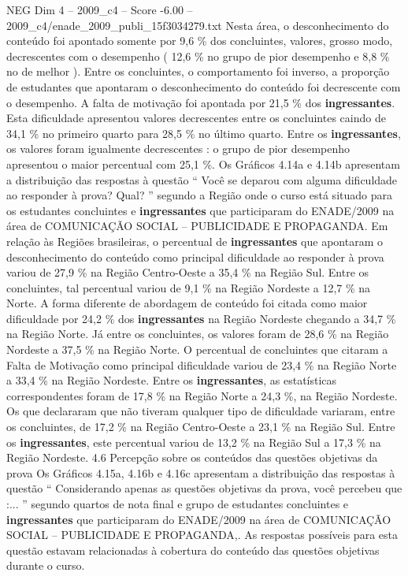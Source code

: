 \begin{textsample}{NEG Dim 4 – 2009\_c4 – Score -6.00 – 2009\_c4/enade\_2009\_publi\_15f3034279.txt}
Nesta área, o desconhecimento do conteúdo foi apontado somente por 9,6 \% dos concluintes, valores, grosso modo, decrescentes com o desempenho ( 12,6 \% no grupo de pior desempenho e 8,8 \% no de melhor ).
Entre os concluintes, o comportamento foi inverso, a proporção de estudantes que apontaram o desconhecimento do conteúdo foi decrescente com o desempenho.
A falta de motivação foi apontada por 21,5 \% dos \textbf{ingressantes}.
Esta dificuldade apresentou valores decrescentes entre os concluintes caindo de 34,1 \% no primeiro quarto para 28,5 \% no último quarto.
Entre os \textbf{ingressantes}, os valores foram igualmente decrescentes : o grupo de pior desempenho apresentou o maior percentual com 25,1 \%.
Os Gráficos 4.14a e 4.14b apresentam a distribuição das respostas à questão “ Você se deparou com alguma dificuldade ao responder à prova?
Qual? ” segundo a Região onde o curso está situado para os estudantes concluintes e \textbf{ingressantes} que participaram do ENADE/2009 na área de COMUNICAÇÃO SOCIAL – PUBLICIDADE E PROPAGANDA.
Em relação às Regiões brasileiras, o percentual de \textbf{ingressantes} que apontaram o desconhecimento do conteúdo como principal dificuldade ao responder à prova variou de 27,9 \% na Região Centro-Oeste a 35,4 \% na Região Sul.
Entre os concluintes, tal percentual variou de 9,1 \% na Região Nordeste a 12,7 \% na Norte.
A forma diferente de abordagem de conteúdo foi citada como maior dificuldade por 24,2 \% dos \textbf{ingressantes} na Região Nordeste chegando a 34,7 \% na Região Norte.
Já entre os concluintes, os valores foram de 28,6 \% na Região Nordeste a 37,5 \% na Região Norte.
O percentual de concluintes que citaram a Falta de Motivação como principal dificuldade variou de 23,4 \% na Região Norte a 33,4 \% na Região Nordeste.
Entre os \textbf{ingressantes}, as estatísticas correspondentes foram de 17,8 \% na Região Norte a 24,3 \%, na Região Nordeste.
Os que declararam que não tiveram qualquer tipo de dificuldade variaram, entre os concluintes, de 17,2 \% na Região Centro-Oeste a 23,1 \% na Região Sul.
Entre os \textbf{ingressantes}, este percentual variou de 13,2 \% na Região Sul a 17,3 \% na Região Nordeste. 4.6 Percepção sobre os conteúdos das questões objetivas da prova Os Gráficos 4.15a, 4.16b e 4.16c apresentam a distribuição das respostas à questão “ Considerando apenas as questões objetivas da prova, você percebeu que :... ” segundo quartos de nota final e grupo de estudantes concluintes e \textbf{ingressantes} que participaram do ENADE/2009 na área de COMUNICAÇÃO SOCIAL – PUBLICIDADE E PROPAGANDA,.
As respostas possíveis para esta questão estavam relacionadas à cobertura do conteúdo das questões objetivas durante o curso.

\end{textsample}
